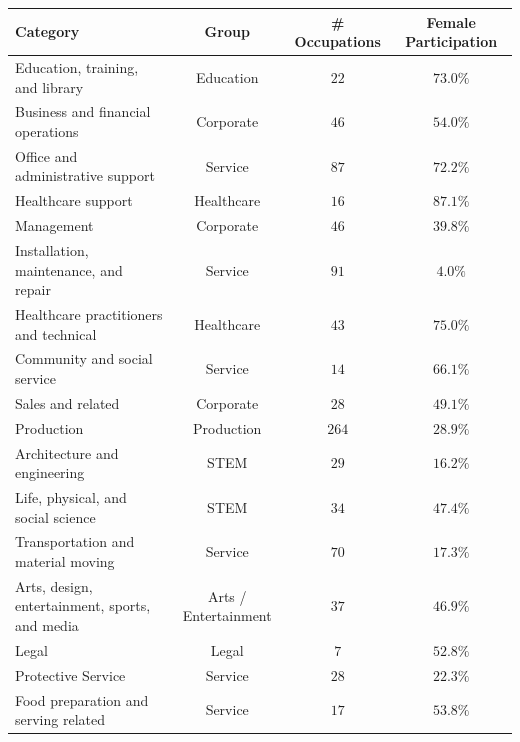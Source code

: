 \documentclass[fleqn,10pt]{article}
\begin{document}
\begin{table}[H]
\begin{small}
	\centering
	\begin{tabular}{|m{3.5cm}|c|c|c|}
	\hline	
	Category 										& Group 						& \# Occupations 	& Female Participation	\\ \hline \hline
	Education, training, and library 				& Education						& $22$ 				& $73.0\%$				\\ \hline
	Business and financial operations				& Corporate						& $46$ 				& $54.0\%$				\\ \hline
	Office and administrative support				& Service						& $87$ 				& $72.2\%$				\\ \hline
	Healthcare support 								& Healthcare					& $16$ 				& $87.1\%$				\\ \hline
	Management 										& Corporate						& $46$ 				& $39.8\%$				\\ \hline
	Installation, maintenance, and repair 			& Service						& $91$ 				& $4.0\%$ 				\\ \hline
	Healthcare practitioners and technical 			& Healthcare					& $43$ 				& $75.0\%$				\\ \hline
	Community and social service 					& Service						& $14$ 				& $66.1\%$				\\ \hline
	Sales and related 								& Corporate						& $28$ 				& $49.1\%$				\\ \hline
	Production 										& Production					& $264$ 			& $28.9\%$				\\ \hline
	Architecture and engineering 					& STEM 							& $29$ 				& $16.2\%$				\\ \hline
	Life, physical, and social science				& STEM 							& $34$ 				& $47.4\%$				\\ \hline
	Transportation and material moving				& Service						& $70$ 				& $17.3\%$				\\ \hline
	Arts, design, entertainment, sports, and media 	& Arts / Entertainment 			& $37$ 				& $46.9\%$				\\ \hline
	Legal											& Legal 						& $7$				& $52.8\%$				\\ \hline
	Protective Service 								& Service 						& $28$ 				& $22.3\%$				\\ \hline
	Food preparation and serving related 			& Service 						& $17$ 				& $53.8\%$				\\ \hline

\end{tabular}
\end{small}
\end{table}
\end{document}
